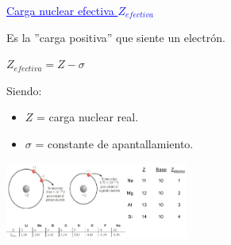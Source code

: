         \begin{center} \textcolor{blue}{\underline{Carga nuclear efectiva $Z_{efectiva}$}} \end{center}
            \indent Es la ''carga positiva'' que siente un electrón.
            \begin{center}
                $Z_{efectiva} = Z - \sigma$
            \end{center}
            \indent Siendo:
            \begin{itemize}
                \item $Z$ = carga nuclear real.
                \item $\sigma$ = constante de apantallamiento.
            \end{itemize}

            \begin{center} \includegraphics[width=6cm]{./imagenes/ejemplosCargaNuclearEfectiva.png} \end{center}

